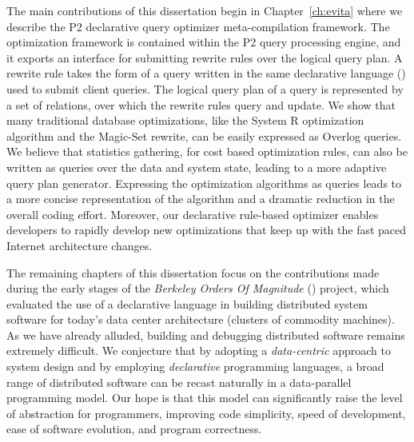 The main contributions of this dissertation begin in Chapter~\ref{ch:evita} where we describe the P2 declarative query optimizer meta-compilation 
framework. The optimization framework is contained within the P2 query processing engine, and it exports an interface for submitting rewrite 
rules over the logical query plan. A rewrite rule takes the form of a query written in the same declarative language (\OVERLOG) used to submit 
client queries. The logical query plan of a query is represented by a set of relations, over which the rewrite rules query and update.  We show that 
many traditional database optimizations, like the System R optimization algorithm and the Magic-Set rewrite, can be easily expressed 
as Overlog queries.  We believe that statistics gathering, for cost based optimization rules, can also be written as \OVERLOG queries over 
the data and system state, leading to a more adaptive query plan generator. Expressing the optimization algorithms as \OVERLOG queries 
leads to a more concise representation of the algorithm and a dramatic reduction in the overall coding effort. Moreover, our declarative
rule-based optimizer enables developers to rapidly develop new optimizations that keep up with the fast paced Internet architecture
changes.
 
The remaining chapters of this dissertation focus on the contributions made during the early stages 
of the {\em Berkeley Orders Of Magnitude} (\BOOM) project, which evaluated the use of a declarative 
language in building distributed system software for today's data center architecture (clusters of commodity 
machines). As we have already alluded, building and debugging distributed software remains extremely 
difficult. We conjecture that by adopting a \emph{data-centric} approach to system design and by employing 
\emph{declarative} programming languages, a broad range of distributed software can be recast naturally in 
a data-parallel programming model.  Our hope is that this model can significantly raise the level of abstraction 
for programmers, improving code simplicity, speed of development, ease of software evolution, and program correctness.

